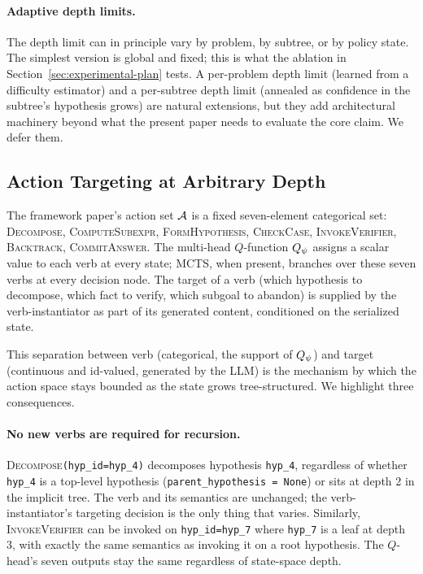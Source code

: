 \paragraph{Adaptive depth limits.}
The depth limit can in principle vary by problem, by subtree, or by
policy state. The simplest version is global and fixed; this is what
the ablation in Section~\ref{sec:experimental-plan} tests. A
per-problem depth limit (learned from a difficulty estimator) and a
per-subtree depth limit (annealed as confidence in the subtree's
hypothesis grows) are natural extensions, but they add architectural
machinery beyond what the present paper needs to evaluate the core
claim. We defer them.

\subsection{Action Targeting at Arbitrary Depth}
\label{sec:method-targeting}

The framework paper's action set $\mathcal{A}$ is a fixed seven-element
categorical set: \textsc{Decompose}, \textsc{ComputeSubexpr},
\textsc{FormHypothesis}, \textsc{CheckCase}, \textsc{InvokeVerifier},
\textsc{Backtrack}, \textsc{CommitAnswer}. The multi-head $Q$-function
$Q_{\psi}$ assigns a scalar value to each verb at every state; MCTS, when
present, branches over these seven verbs at every decision node. The
target of a verb (which hypothesis to decompose, which fact to verify,
which subgoal to abandon) is supplied by the verb-instantiator as part
of its generated content, conditioned on the serialized state.

This separation between verb (categorical, the support of $Q_{\psi}$) and
target (continuous and id-valued, generated by the LLM) is the
mechanism by which the action space stays bounded as the state grows
tree-structured. We highlight three consequences.

\paragraph{No new verbs are required for recursion.}
\textsc{Decompose}\texttt{(hyp\_id=hyp\_4)} decomposes hypothesis
\texttt{hyp\_4}, regardless of whether \texttt{hyp\_4} is a top-level
hypothesis (\texttt{parent\_hypothesis = None}) or sits at depth 2 in
the implicit tree. The verb and its semantics are unchanged; the
verb-instantiator's targeting decision is the only thing that varies.
Similarly, \textsc{InvokeVerifier} can be invoked on
\texttt{hyp\_id=hyp\_7} where \texttt{hyp\_7} is a leaf at depth 3, with
exactly the same semantics as invoking it on a root hypothesis. The
$Q$-head's seven outputs stay the same regardless of state-space depth.

